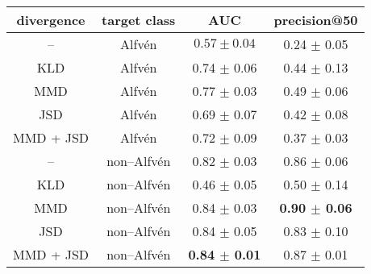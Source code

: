 \begin{tabular}[h]{c c c c} 
divergence & target class & AUC & precision@50 \\ 
\hline 
-- & Alfv\'en & $0.57 \pm 0.04$ & 0.24 $\pm$ 0.05 \\ 
KLD & Alfv\'en & 0.74 $\pm$ 0.06 & 0.44 $\pm$ 0.13 \\ 
MMD & Alfv\'en & 0.77 $\pm$ 0.03 & 0.49 $\pm$ 0.06 \\ 
JSD & Alfv\'en & 0.69 $\pm$ 0.07 & 0.42 $\pm$ 0.08 \\ 
MMD + JSD & Alfv\'en & 0.72 $\pm$ 0.09 & 0.37 $\pm$ 0.03 \\
-- & non--Alfv\'en & 0.82 $\pm$ 0.03 & 0.86 $\pm$ 0.06 \\ 
KLD & non--Alfv\'en & 0.46 $\pm$ 0.05 & 0.50 $\pm$ 0.14 \\ 
MMD & non--Alfv\'en & 0.84 $\pm$ 0.03 & \textbf{0.90 $\pm$ 0.06} \\ 
JSD & non--Alfv\'en & 0.84 $\pm$ 0.05 & 0.83 $\pm$ 0.10 \\ 
MMD + JSD & non--Alfv\'en & \textbf{0.84 $\pm$ 0.01} & 0.87 $\pm$ 0.01 \\ 
\end{tabular}
